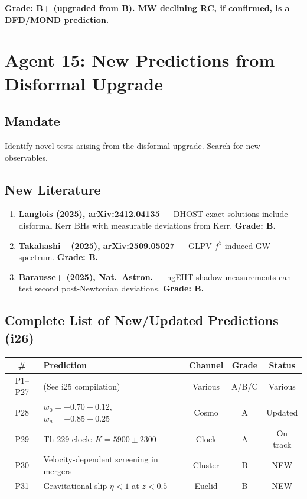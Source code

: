 \documentclass[11pt,a4paper]{article}
\begin{document}
\textbf{Grade: B+ (upgraded from B). MW declining RC, if confirmed, is a DFD/MOND prediction.}

\section{Agent 15: New Predictions from Disformal Upgrade}

\subsection{Mandate}
Identify novel tests arising from the disformal upgrade. Search for new observables.

\subsection{New Literature}

\begin{enumerate}

\item \textbf{Langlois (2025), arXiv:2412.04135} --- DHOST exact solutions include disformal Kerr BHs with measurable deviations from Kerr. \textbf{Grade: B.}

\item \textbf{Takahashi+ (2025), arXiv:2509.05027} --- GLPV $f^5$ induced GW spectrum. \textbf{Grade: B.}

\item \textbf{Barausse+ (2025), Nat.\ Astron.} --- ngEHT shadow measurements can test second post-Newtonian deviations. \textbf{Grade: B.}

\end{enumerate}

\subsection{Complete List of New/Updated Predictions (i26)}

\begin{center}
\begin{longtable}{clccc}
\toprule
\textbf{\#} & \textbf{Prediction} & \textbf{Channel} & \textbf{Grade} & \textbf{Status} \\
\midrule
\endhead
P1--P27 & (See i25 compilation) & Various & A/B/C & Various \\
P28 & $w_0 = -0.70\pm0.12$, $w_a = -0.85\pm0.25$ & Cosmo & A & Updated \\
P29 & Th-229 clock: $K = 5900\pm2300$ & Clock & A & On track \\
P30 & Velocity-dependent screening in mergers & Cluster & B & NEW \\
P31 & Gravitational slip $\eta < 1$ at $z < 0.5$ & Euclid & B & NEW \\
\bottomrule
\end{longtable}
\end{center}
\end{document}
